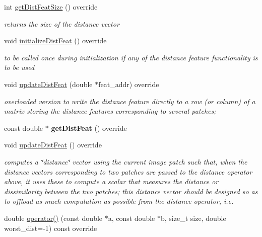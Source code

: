 \begin{DoxyCompactItemize}
\item 
\hypertarget{classRIU_a6925a29c0c74daeb0448492baff58d46}{int \hyperlink{classRIU_a6925a29c0c74daeb0448492baff58d46}{get\-Dist\-Feat\-Size} () override}\label{classRIU_a6925a29c0c74daeb0448492baff58d46}

\begin{DoxyCompactList}\small\item\em returns the size of the distance vector \end{DoxyCompactList}\item 
\hypertarget{classRIU_a7c582ab310acf216d7afbf29df238b83}{void \hyperlink{classRIU_a7c582ab310acf216d7afbf29df238b83}{initialize\-Dist\-Feat} () override}\label{classRIU_a7c582ab310acf216d7afbf29df238b83}

\begin{DoxyCompactList}\small\item\em to be called once during initialization if any of the distance feature functionality is to be used \end{DoxyCompactList}\item 
\hypertarget{classRIU_abdb393427c76e47be83292231ee22c06}{void \hyperlink{classRIU_abdb393427c76e47be83292231ee22c06}{update\-Dist\-Feat} (double $\ast$feat\-\_\-addr) override}\label{classRIU_abdb393427c76e47be83292231ee22c06}

\begin{DoxyCompactList}\small\item\em overloaded version to write the distance feature directly to a row (or column) of a matrix storing the distance features corresponding to several patches; \end{DoxyCompactList}\item 
\hypertarget{classRIU_a0b9adf31aba2ea3e719a06b38cdc5060}{const double $\ast$ {\bfseries get\-Dist\-Feat} () override}\label{classRIU_a0b9adf31aba2ea3e719a06b38cdc5060}

\item 
void \hyperlink{classRIU_ad58a1907ddcc9a77f9f83fa3882f0ab4}{update\-Dist\-Feat} () override
\begin{DoxyCompactList}\small\item\em computes a \char`\"{}distance\char`\"{} vector using the current image patch such that, when the distance vectors corresponding to two patches are passed to the distance operator above, it uses these to compute a scalar that measures the distance or dissimilarity between the two patches; this distance vector should be designed so as to offload as much computation as possible from the distance operator, i.\-e. \end{DoxyCompactList}\item 
\hypertarget{classRIU_a0b411b7462fc0c24f2bd737b40a5c09c}{double \hyperlink{classRIU_a0b411b7462fc0c24f2bd737b40a5c09c}{operator()} (const double $\ast$a, const double $\ast$b, size\-\_\-t size, double worst\-\_\-dist=-\/1) const override}\label{classRIU_a0b411b7462fc0c24f2bd737b40a5c09c}


\end{DoxyCompactItemize}
